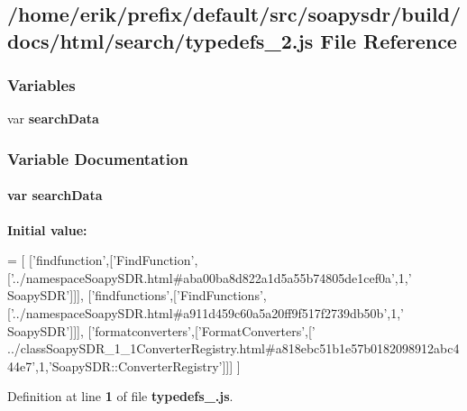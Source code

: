 \subsection{/home/erik/prefix/default/src/soapysdr/build/docs/html/search/typedefs\+\_\+2.js File Reference}
\label{typedefs__2_8js}
\subsubsection*{Variables}
\begin{DoxyCompactItemize}
\item 
var {\bf search\+Data}
\end{DoxyCompactItemize}


\subsubsection{Variable Documentation}
\paragraph[{search\+Data}]{\setlength{\rightskip}{0pt plus 5cm}var search\+Data}\label{typedefs__2_8js_ad01a7523f103d6242ef9b0451861231e}
{\bfseries Initial value\+:}
\begin{DoxyCode}
=
[
  [\textcolor{stringliteral}{'findfunction'},[\textcolor{stringliteral}{'FindFunction'},[\textcolor{stringliteral}{'../namespaceSoapySDR.html#aba00ba8d822a1d5a55b74805de1cef0a'},1,\textcolor{stringliteral}{'
      SoapySDR'}]]],
  [\textcolor{stringliteral}{'findfunctions'},[\textcolor{stringliteral}{'FindFunctions'},[\textcolor{stringliteral}{'../namespaceSoapySDR.html#a911d459c60a5a20ff9f517f2739db50b'},1,\textcolor{stringliteral}{'
      SoapySDR'}]]],
  [\textcolor{stringliteral}{'formatconverters'},[\textcolor{stringliteral}{'FormatConverters'},[\textcolor{stringliteral}{'
      ../classSoapySDR\_1\_1ConverterRegistry.html#a818ebc51b1e57b0182098912abc444e7'},1,\textcolor{stringliteral}{'SoapySDR::ConverterRegistry'}]]]
]
\end{DoxyCode}


Definition at line {\bf 1} of file {\bf typedefs\+\_.\+js}.

